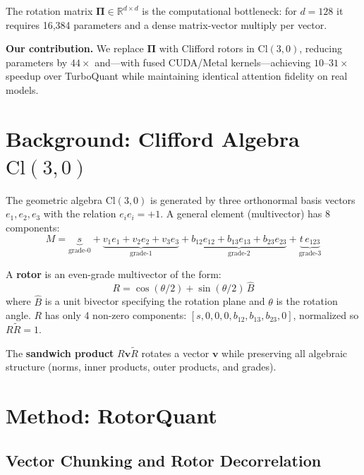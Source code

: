 \documentclass[10pt,twocolumn]{article}
\begin{document}
The rotation matrix $\mathbf{\Pi} \in \mathbb{R}^{d \times d}$ is the computational bottleneck: for $d=128$ it requires 16,384 parameters and a dense matrix-vector multiply per vector.

\textbf{Our contribution.}
We replace $\mathbf{\Pi}$ with Clifford rotors in $\mathrm{Cl}(3,0)$, reducing parameters by $44\times$ and---with fused CUDA/Metal kernels---achieving $10$--$31\times$ speedup over TurboQuant while maintaining identical attention fidelity on real models.

\section{Background: Clifford Algebra $\mathrm{Cl}(3,0)$}
\label{sec:clifford}

The geometric algebra $\mathrm{Cl}(3,0)$ is generated by three orthonormal basis vectors $e_1, e_2, e_3$ with the relation $e_i e_i = +1$.
A general element (multivector) has 8 components:
\begin{equation}
  M = \underbrace{s}_{\text{grade-0}} + \underbrace{v_1 e_1 + v_2 e_2 + v_3 e_3}_{\text{grade-1}} + \underbrace{b_{12} e_{12} + b_{13} e_{13} + b_{23} e_{23}}_{\text{grade-2}} + \underbrace{t\, e_{123}}_{\text{grade-3}}
\end{equation}

A \textbf{rotor} is an even-grade multivector of the form:
\begin{equation}
  R = \cos(\theta/2) + \sin(\theta/2)\,\hat{B}
\end{equation}
where $\hat{B}$ is a unit bivector specifying the rotation plane and $\theta$ is the rotation angle.
$R$ has only 4 non-zero components: $[s, 0, 0, 0, b_{12}, b_{13}, b_{23}, 0]$, normalized so $R\tilde{R} = 1$.

The \textbf{sandwich product} $R\mathbf{v}\tilde{R}$ rotates a vector $\mathbf{v}$ while preserving all algebraic structure (norms, inner products, outer products, and grades).

\section{Method: RotorQuant}
\label{sec:method}

\subsection{Vector Chunking and Rotor Decorrelation}
\end{document}
